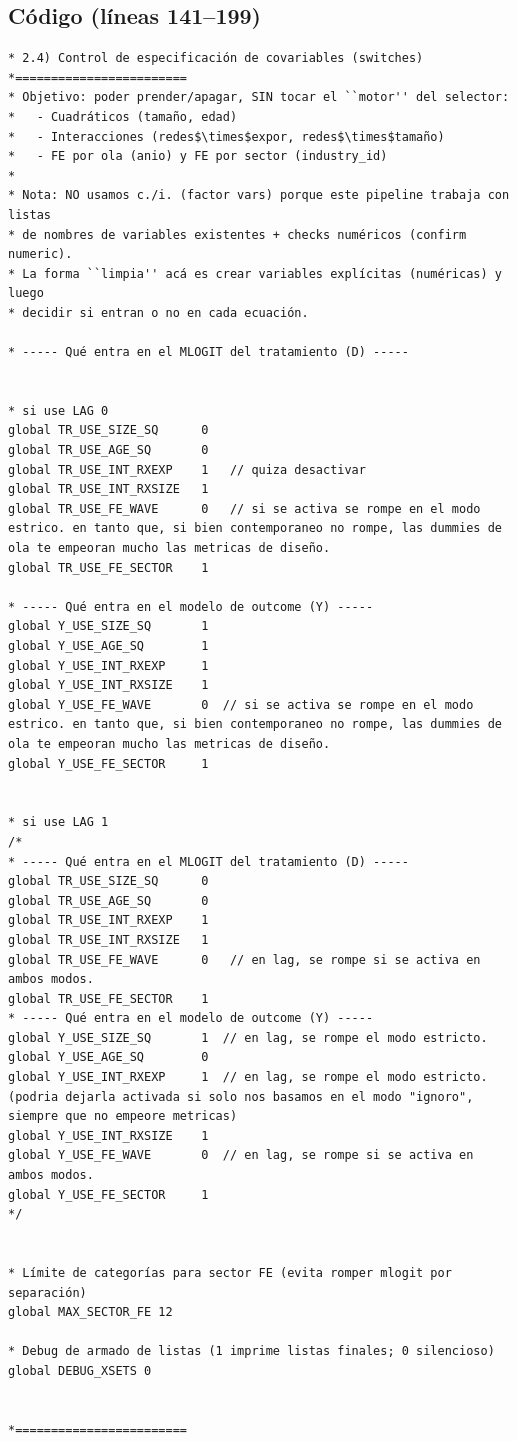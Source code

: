 \documentclass[12pt]{article}
\begin{document}
\subsection*{Código (líneas 141--199)}
\begin{lstlisting}
* 2.4) Control de especificación de covariables (switches)
*========================
* Objetivo: poder prender/apagar, SIN tocar el ``motor'' del selector:
*   - Cuadráticos (tamaño, edad)
*   - Interacciones (redes$\times$expor, redes$\times$tamaño)
*   - FE por ola (anio) y FE por sector (industry_id)
*
* Nota: NO usamos c./i. (factor vars) porque este pipeline trabaja con listas
* de nombres de variables existentes + checks numéricos (confirm numeric).
* La forma ``limpia'' acá es crear variables explícitas (numéricas) y luego
* decidir si entran o no en cada ecuación.

* ----- Qué entra en el MLOGIT del tratamiento (D) -----
 

* si use LAG 0
global TR_USE_SIZE_SQ      0 
global TR_USE_AGE_SQ       0  
global TR_USE_INT_RXEXP    1   // quiza desactivar
global TR_USE_INT_RXSIZE   1   
global TR_USE_FE_WAVE      0   // si se activa se rompe en el modo estrico. en tanto que, si bien contemporaneo no rompe, las dummies de ola te empeoran mucho las metricas de diseño.
global TR_USE_FE_SECTOR    1	   

* ----- Qué entra en el modelo de outcome (Y) -----
global Y_USE_SIZE_SQ       1 
global Y_USE_AGE_SQ        1
global Y_USE_INT_RXEXP     1 
global Y_USE_INT_RXSIZE    1
global Y_USE_FE_WAVE       0  // si se activa se rompe en el modo estrico. en tanto que, si bien contemporaneo no rompe, las dummies de ola te empeoran mucho las metricas de diseño.
global Y_USE_FE_SECTOR     1 


* si use LAG 1
/*
* ----- Qué entra en el MLOGIT del tratamiento (D) -----
global TR_USE_SIZE_SQ      0  
global TR_USE_AGE_SQ       0  
global TR_USE_INT_RXEXP    1   
global TR_USE_INT_RXSIZE   1   
global TR_USE_FE_WAVE      0   // en lag, se rompe si se activa en ambos modos.
global TR_USE_FE_SECTOR    1   
* ----- Qué entra en el modelo de outcome (Y) -----
global Y_USE_SIZE_SQ       1  // en lag, se rompe el modo estricto.  
global Y_USE_AGE_SQ        0
global Y_USE_INT_RXEXP     1  // en lag, se rompe el modo estricto.  (podria dejarla activada si solo nos basamos en el modo "ignoro", siempre que no empeore metricas)
global Y_USE_INT_RXSIZE    1
global Y_USE_FE_WAVE       0  // en lag, se rompe si se activa en ambos modos.
global Y_USE_FE_SECTOR     1  
*/


* Límite de categorías para sector FE (evita romper mlogit por separación)
global MAX_SECTOR_FE 12

* Debug de armado de listas (1 imprime listas finales; 0 silencioso)
global DEBUG_XSETS 0


*========================
\end{lstlisting}
\end{document}
